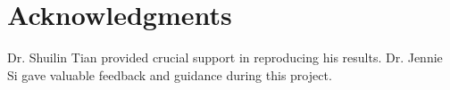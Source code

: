 \documentclass[journal]{IEEEtran}
\begin{document}
\section*{Acknowledgments}

Dr. Shuilin Tian provided crucial support in reproducing his results. 
Dr. Jennie Si gave valuable feedback and guidance during this project.

\ifCLASSOPTIONcaptionsoff
  \newpage
\fi





%
%
%



{\vspace{\baselineskip}
	
	
}

% 
\end{document}
